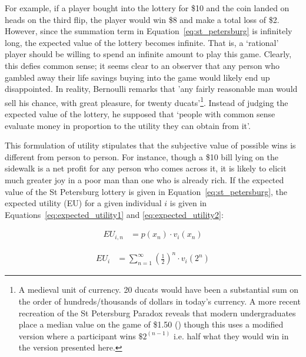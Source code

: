 For example, if a player bought into the lottery for \$10 and the coin landed on heads on the third flip, the player would win \$8 and make a total loss of \$2. However, since the summation term in Equation~\ref{eq:st_petersburg} is infinitely long, the expected value of the lottery becomes infinite. That is, a ‘rational’ player should be willing to spend an infinite amount to play this game. Clearly, this defies common sense; it seems clear to an observer that any person who gambled away their life savings buying into the game would likely end up disappointed. In reality, Bernoulli remarks that 'any fairly reasonable man would sell his chance, with great pleasure, for twenty ducats’\footnote{A medieval unit of currency. 20 ducats would have been a substantial sum on the order of hundreds/thousands of dollars in today’s currency. A more recent recreation of the St Petersburg Paradox reveals that modern undergraduates place a median value on the game of \$1.50 (\cite{haydenFictiveRewardSignals2009}) though this uses a modified version where a participant wins $\$2^{(n-1)}$ i.e. half what they would win in the version presented here.}. Instead of judging the expected value of the lottery, he supposed that ‘people with common sense evaluate money in proportion to the utility they can obtain from it’.

This formulation of utility stipulates that the subjective value of possible wins is different from person to person. For instance, though a \$10 bill lying on the sidewalk is a net profit for any person who comes across it, it is likely to elicit much greater joy in a poor man than one who is already rich. If the expected value of the St Petersburg lottery is given in Equation~\ref{eq:st_petersburg}, the expected utility (EU) for a given individual $i$ is given in Equations~\ref{eq:expected_utility1} and \ref{eq:expected_utility2}:

\begin{align}
EU_{i,n} &= p(x_n) \cdot v_i(x_n)
\label{eq:expected_utility1}
\end{align}

\begin{align}
EU_i &= \sum_{n=1}^{\infty} \left(\frac{1}{2}\right)^n \cdot v_i(2^n)
\label{eq:expected_utility2}
\end{align}

